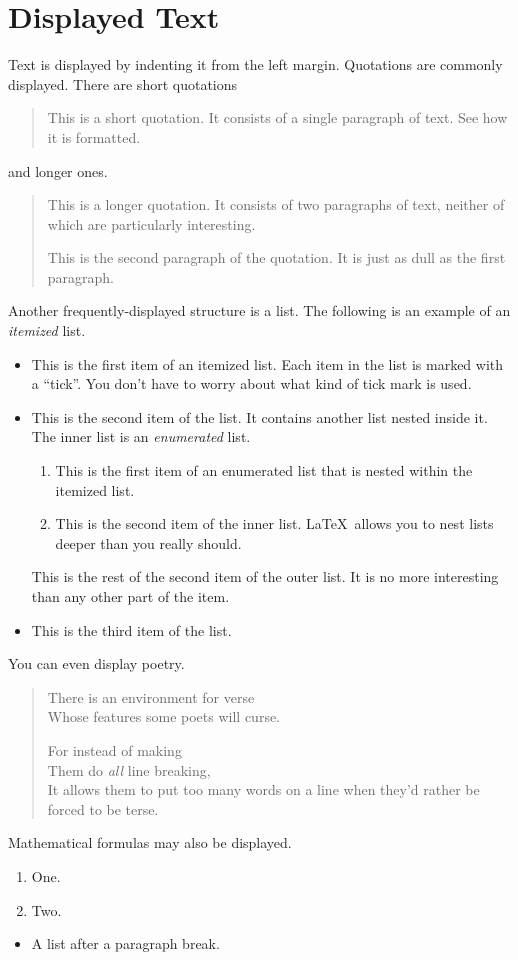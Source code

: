 \documentclass{article}
\begin{document}
\section{Displayed Text}

Text is displayed by indenting it from the left margin.
Quotations are commonly displayed.  There are short quotations
\begin{quote}
   This is a short quotation.  It consists of a
   single paragraph of text.  See how it is formatted.
\end{quote}
and longer ones.
\begin{quotation}
   This is a longer quotation.  It consists of two
   paragraphs of text, neither of which are
   particularly interesting.

   This is the second paragraph of the quotation.  It
   is just as dull as the first paragraph.
\end{quotation}
Another frequently-displayed structure is a list.
The following is an example of an \emph{itemized}
list.
\begin{itemize}
   \item This is the first item of an itemized list.
         Each item in the list is marked with a ``tick''.
         You don't have to worry about what kind of tick
         mark is used.

   \item This is the second item of the list.  It
         contains another list nested inside it.  The inner
         list is an \emph{enumerated} list.
         \begin{enumerate}
            \item This is the first item of an enumerated
                  list that is nested within the itemized list.

            \item This is the second item of the inner list.
                  \LaTeX\ allows you to nest lists deeper than
                  you really should.
         \end{enumerate}
         This is the rest of the second item of the outer
         list.  It is no more interesting than any other
         part of the item.
   \item This is the third item of the list.
\end{itemize}
You can even display poetry.
\begin{verse}
   There is an environment
    for verse \\
   Whose features some poets
   will curse.

   For instead of making\\
   Them do \emph{all} line breaking, \\
   It allows them to put too many words on a line when they'd rather be
   forced to be terse.
\end{verse}

Mathematical formulas may also be displayed.
\begin{enumerate}
\item One.
\item Two.
\end{enumerate}

\begin{itemize}
\item A list after a paragraph break.
\end{itemize}
\end{document}
